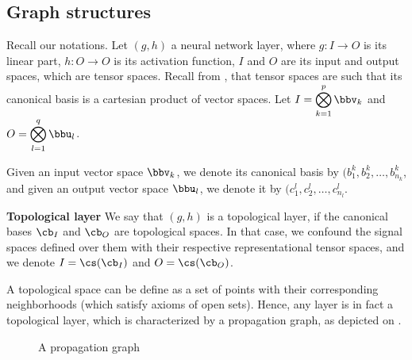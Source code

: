 

\subsection{Graph structures}

Recall our notations. Let $(g,h)$ a neural network layer, where $g: I \rightarrow O$ is its linear part, $h : O \rightarrow O$ is its activation function, $I$ and $O$ are its input and output spaces, which are tensor spaces. Recall from , that tensor spaces are such that its canonical basis is a cartesian product of vector spaces. Let $I = \displaystyle \bigotimes_{k=1}^p \bbv_k$ and $O = \displaystyle \bigotimes_{l=1}^q \bbu_l$.

Given an input vector space $\bbv_k$, we denote its canonical basis by $(b^k_1, b^k_2, \ldots, b^k_{n_k}$, and given an output vector space $\bbu_l$, we denote it by $(c^l_1, c^l_2, \ldots, c^l_{n_l}$.



\begin{definition}\textbf{Topological layer}
We say that $(g,h)$ is a topological layer, if the canonical bases $\cb_I$ and $\cb_O$ are topological spaces. In that case, we confound the signal spaces defined over them with their respective representational tensor spaces, and we denote $I = \cs(\cb_I)$ and $O = \cs(\cb_O)$.
\end{definition}

A topological space can be define as a set of points with their corresponding neighborhoods (which satisfy axioms of open sets). Hence, any layer is in fact a topological layer, which is characterized by a propagation graph, as depicted on .

\begin{figure}[H]
\centering
{}
\caption{A propagation graph}
\label{fig:pgraph}
\end{figure}

